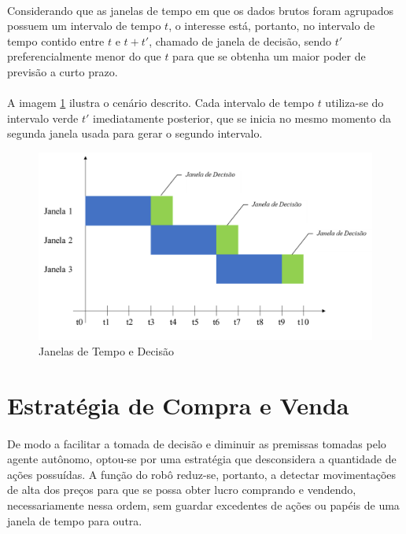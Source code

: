 \documentclass[grad,numbers]{coppe}
\begin{document}
            \paragraph{}Considerando que as janelas de tempo em que os dados brutos foram agrupados possuem um intervalo de tempo $t$, o interesse está, portanto, no intervalo de tempo contido entre $t$ e $t + t'$, chamado de janela de decisão, sendo $t'$ preferencialmente menor do que $t$ para que se obtenha um maior poder de previsão a curto prazo.
            
            \paragraph{}A imagem \ref{img:dados-agrupados} ilustra o cenário descrito. Cada intervalo de tempo $t$ utiliza-se do intervalo verde $t'$ imediatamente posterior, que se inicia no mesmo momento da segunda janela usada para gerar o segundo intervalo.
            
            
            \begin{figure}[h]
                \caption{Janelas de Tempo e Decisão}
                \label{img:dados-agrupados}
                \includegraphics[width=15cm]{dados-agrupados.png}
                \centering
            \end{figure}
      
        \section{Estratégia de Compra e Venda}\label{sec:estrategia-saida}
            \paragraph{}De modo a facilitar a tomada de decisão e diminuir as premissas tomadas pelo agente autônomo, optou-se por uma estratégia que desconsidera a quantidade de ações possuídas. A função do robô reduz-se, portanto, a detectar movimentações de alta dos preços para que se possa obter lucro comprando e vendendo, necessariamente nessa ordem, sem guardar excedentes de ações ou papéis de uma janela de tempo para outra. 
            
\end{document}
